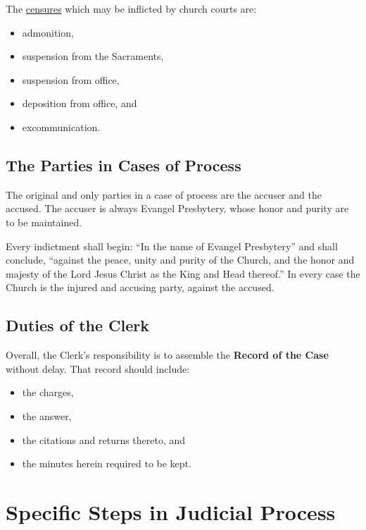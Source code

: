 \documentclass[
]{book}
\providecommand{\tightlist}{%
  \setlength{\itemsep}{0pt}\setlength{\parskip}{0pt}}
\begin{document}
The \href{https://evangel.pressbooks.com/chapter/33-church-censures/}{censures} which may be inflicted by church courts are:

\begin{itemize}
\tightlist
\item
  admonition,
\item
  suspension from the Sacraments,
\item
  suspension from office,
\item
  deposition from office, and
\item
  excommunication.
\end{itemize}

\hypertarget{the-parties-in-cases-of-process}{%
\subsection{The Parties in Cases of Process}\label{the-parties-in-cases-of-process}}

The original and only parties in a case of process are the accuser and the accused. The accuser is always Evangel Presbytery, whose honor and purity are to be maintained.

Every indictment shall begin: ``In the name of Evangel Presbytery'' and shall conclude, ``against the peace, unity and purity of the Church, and the honor and majesty of the Lord Jesus Christ as the King and Head thereof.'' In every case the Church is the injured and accusing party, against the accused.

\hypertarget{duties-of-the-clerk}{%
\subsection{Duties of the Clerk}\label{duties-of-the-clerk}}

Overall, the Clerk's responsibility is to assemble the \textbf{Record of the Case} without delay. That record should include:

\begin{itemize}
\tightlist
\item
  the charges,
\item
  the answer,
\item
  the citations and returns thereto, and
\item
  the minutes herein required to be kept.
\end{itemize}

\hypertarget{specific-steps-in-judicial-process}{%
\section{Specific Steps in Judicial Process}\label{specific-steps-in-judicial-process}}
\end{document}

